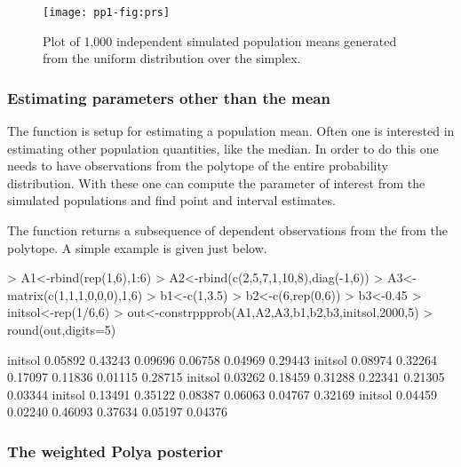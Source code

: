 \documentclass{article}
\begin{document}
\begin{figure}
\begin{center}
\texttt{[image: pp1-fig:prs]}
\end{center}
\caption{Plot of 1,000 independent simulated population means 
generated from  the uniform distribution over the simplex.}
\label{fig:prs}
\end{figure}

\subsubsection{Estimating parameters other than the mean}

The function \verb@constrppmn@ is setup for estimating 
a population mean. Often one is interested in estimating 
other population quantities, like the median. In order to 
do this one needs to have observations from the polytope 
of the entire probability distribution. With these one can 
compute the parameter of interest from the simulated 
populations and find point and interval estimates.

The function \verb@constrppprob@ returns a subsequence of 
 dependent observations from the from the polytope.
A simple example is given just below.

\begin{Schunk}
\begin{Sinput}
> A1<-rbind(rep(1,6),1:6)
> A2<-rbind(c(2,5,7,1,10,8),diag(-1,6))
> A3<-matrix(c(1,1,1,0,0,0),1,6)
> b1<-c(1,3.5)
> b2<-c(6,rep(0,6))
> b3<-0.45
> initsol<-rep(1/6,6)
> out<-constrppprob(A1,A2,A3,b1,b2,b3,initsol,2000,5)
> round(out,digits=5)
\end{Sinput}
\begin{Soutput}
           [,1]    [,2]    [,3]    [,4]    [,5]    [,6]
initsol 0.05892 0.43243 0.09696 0.06758 0.04969 0.29443
initsol 0.08974 0.32264 0.17097 0.11836 0.01115 0.28715
initsol 0.03262 0.18459 0.31288 0.22341 0.21305 0.03344
initsol 0.13491 0.35122 0.08387 0.06063 0.04767 0.32169
initsol 0.04459 0.02240 0.46093 0.37634 0.05197 0.04376
\end{Soutput}
\end{Schunk}

\subsubsection{The weighted Polya posterior}
\end{document}
